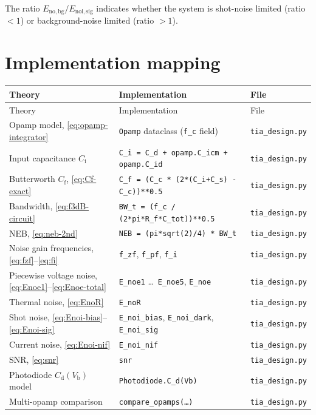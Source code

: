 \documentclass[a4paper,11pt]{article}
\begin{document}
The ratio $E_{\mathrm{no,bg}} / E_{\mathrm{noi,sig}}$ indicates
whether the system is shot-noise limited (ratio $< 1$) or
background-noise limited (ratio $> 1$).

\section{Implementation mapping}
\label{sec:implementation}

\begin{longtable}{@{} p{} p{}
                      p{} @{}}
\toprule
Theory & Implementation & File \\
\midrule
\endfirsthead
\toprule
Theory & Implementation & File \\
\midrule
\endhead
\bottomrule
\endlastfoot
Opamp model, \eqref{eq:opamp-integrator}
  & \texttt{Opamp} dataclass (\texttt{f\_c} field)
  & \texttt{tia\_design.py} \\
Input capacitance $C_{\mathrm{i}}$
  & \texttt{C\_i = C\_d + opamp.C\_icm + opamp.C\_id}
  & \texttt{tia\_design.py} \\
Butterworth $C_{\mathrm{f}}$, \eqref{eq:Cf-exact}
  & \texttt{C\_f = (C\_c * (2*(C\_i+C\_s) - C\_c))**0.5}
  & \texttt{tia\_design.py} \\
Bandwidth, \eqref{eq:f3dB-circuit}
  & \texttt{BW\_t = (f\_c / (2*pi*R\_f*C\_tot))**0.5}
  & \texttt{tia\_design.py} \\
NEB, \eqref{eq:neb-2nd}
  & \texttt{NEB = (pi*sqrt(2)/4) * BW\_t}
  & \texttt{tia\_design.py} \\
Noise gain frequencies, \eqref{eq:fzf}--\eqref{eq:fi}
  & \texttt{f\_zf}, \texttt{f\_pf}, \texttt{f\_i}
  & \texttt{tia\_design.py} \\
Piecewise voltage noise, \eqref{eq:Enoe1}--\eqref{eq:Enoe-total}
  & \texttt{E\_noe1} \ldots\ \texttt{E\_noe5}, \texttt{E\_noe}
  & \texttt{tia\_design.py} \\
Thermal noise, \eqref{eq:EnoR}
  & \texttt{E\_noR}
  & \texttt{tia\_design.py} \\
Shot noise, \eqref{eq:Enoi-bias}--\eqref{eq:Enoi-sig}
  & \texttt{E\_noi\_bias}, \texttt{E\_noi\_dark}, \texttt{E\_noi\_sig}
  & \texttt{tia\_design.py} \\
Current noise, \eqref{eq:Enoi-nif}
  & \texttt{E\_noi\_nif}
  & \texttt{tia\_design.py} \\
SNR, \eqref{eq:snr}
  & \texttt{snr}
  & \texttt{tia\_design.py} \\
Photodiode $C_{\mathrm{d}}(V_{\mathrm{b}})$ model
  & \texttt{Photodiode.C\_d(Vb)}
  & \texttt{tia\_design.py} \\
Multi-opamp comparison
  & \texttt{compare\_opamps(\ldots)}
  & \texttt{tia\_design.py} \\
\end{longtable}
\end{document}
